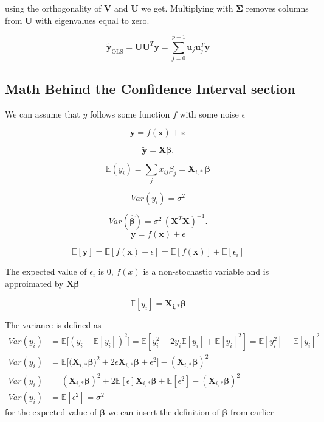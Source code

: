 \documentclass[twoside,11pt]{report}
\begin{document}
using the orthogonality of $\mathbf{V}$ and $\mathbf{U}$ we get. Multiplying with $\mathbf{\Sigma}$ removes columns from $\mathbf{U}$ with eigenvalues equal to zero.

$$
\tilde{\mathbf{y}}_{\mathrm{OLS}} = \mathbf{U}\mathbf{U}^T \mathbf{y}= \sum_{j=0}^{p-1}\mathbf{u}_j\mathbf{u}_j^T\mathbf{y}
$$




%
\subsection*{Math Behind the Confidence Interval section}
\label{app:confidenceInterval}
We can assume that $y$ follows some function $f$ with some noise $\epsilon$

$$
\mathbf{y} = f(\mathbf{x})+\mathbf{\varepsilon}
$$

$$
\mathbf{\tilde{y}} = \mathbf{X}\mathbf{\beta}.
$$

$$
\mathbb{E}(y_i)  =\sum_{j}x_{ij} \beta_j=\mathbf{X}_{i, \ast} \, \mathbf{\beta}
$$

$$
{Var}(y_i)  = \sigma^2
$$

$$
{Var}(\mathbf{\hat{\beta}}) = \sigma^2 \, (\mathbf{X}^{T} \mathbf{X})^{-1}.
$$
$$
\mathbf{y} = f(\mathbf{x}) + \epsilon
$$

$$
\mathbb{E}[\mathbf{y}] = \mathbb{E}[f(\mathbf{x} )+ \epsilon] = \mathbb{E}[f(\mathbf{x})] + \mathbb{E}[\epsilon_i]
$$

The expected value of $\epsilon_i$ is $0$, $f(x)$ is a non-stochastic variable and is approimated by $\mathbf{X}\mathbf{\beta}$

$$
\mathbb{E}[y_i] = \mathbf{X_{i,*}}\mathbf{\beta}
$$

The variance is defined as
\begin{align*}
Var(y_i) &= \mathbb{E}\big[(y_i - \mathbb{E}[y_i])^2\big] = \mathbb{E}\left[y_i^2 - 2y_i\mathbb{E}[y_i] + \mathbb{E}[y_i]^2\right] = \mathbb{E}[y_i^2] - \mathbb{E}[y_i]^2\\
Var(y_i) &= \mathbb{E}\big[\big(\mathbf{X}_{i,*}\mathbf{\beta}\big)^2 + 2\epsilon \mathbf{X}_{i,*}\mathbf{\beta} + \epsilon^2 \big] - (\mathbf{X}_{i,*}\mathbf{\beta})^2\\
Var(y_i) &= (\mathbf{X}_{i,*}\mathbf{\beta})^2 + 2\mathbb{E}[\epsilon]\mathbf{X}_{i,*}\mathbf{\beta} + \mathbb{E}[\epsilon^2] - (\mathbf{X}_{i,*}\mathbf{\beta})^2\\
Var(y_i) &= \mathbb{E}[\epsilon^2] = \sigma^2
\end{align*}
for the expected value of $\mathbf{\beta}$ we can insert the definition of $\mathbf{\beta}$ from earlier
\end{document}
